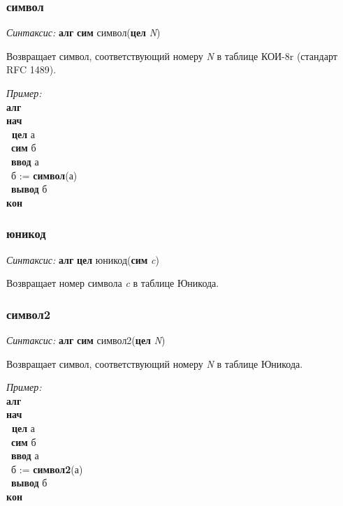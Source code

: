 \documentclass[12pt,a4paper]{article}
\newcommand{\otstup}{\textperiodcentered\ }
\begin{document}
\normalfont
\subsubsection{символ}

\emph{Синтаксис:} \textbf{алг} \textbf{сим} символ(\textbf{цел} \emph{N})


    

      Возвращает символ, соответствующий номеру \emph{N} в таблице КОИ-8r (стандарт RFC 1489).

\emph{Пример:}      
\sffamily
~\\\textbf{алг 
~\\нач
~\\\otstup цел} а
~\\\otstup \textbf{сим} б
~\\\otstup \textbf{ввод} а
~\\\otstup б := \textbf{символ}(а)
~\\\otstup \textbf{вывод} б
~\\\textbf{кон  }




\normalfont
\subsubsection{юникод}

\emph{Синтаксис:} \textbf{алг} \textbf{цел} юникод(\textbf{сим} \emph{c})


    
      Возвращает номер символа \emph{c} в таблице Юникода.
      
  
\normalfont

\normalfont
\subsubsection{символ2}

\emph{Синтаксис:} \textbf{алг} \textbf{сим} символ2(\textbf{цел} \emph{N})


   
 
      Возвращает символ, соответствующий номеру \emph{N} в таблице Юникода.
      
\emph{Пример:}  
\sffamily
~\\\textbf{алг 
~\\нач
~\\\otstup цел} а
~\\\otstup \textbf{сим} б
~\\\otstup \textbf{ввод} а
~\\\otstup б := \textbf{символ2}(а)
~\\\otstup \textbf{вывод} б
~\\\textbf{кон}
\end{document}
